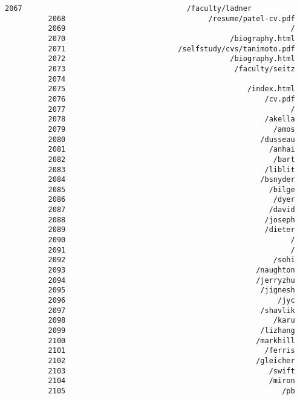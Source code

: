 \documentclass[11pt]{article}
\begin{document}
\begin{Verbatim}[commandchars=\\\{\}]
          2067                                      /faculty/ladner
          2068                                 /resume/patel-cv.pdf
          2069                                                    /
          2070                                      /biography.html
          2071                          /selfstudy/cvs/tanimoto.pdf
          2072                                      /biography.html
          2073                                       /faculty/seitz
          2074                                                     
          2075                                          /index.html
          2076                                              /cv.pdf
          2077                                                    /
          2078                                              /akella
          2079                                                /amos
          2080                                             /dusseau
          2081                                               /anhai
          2082                                                /bart
          2083                                              /liblit
          2084                                             /bsnyder
          2085                                               /bilge
          2086                                                /dyer
          2087                                               /david
          2088                                              /joseph
          2089                                              /dieter
          2090                                                    /
          2091                                                    /
          2092                                                /sohi
          2093                                            /naughton
          2094                                            /jerryzhu
          2095                                             /jignesh
          2096                                                 /jyc
          2097                                             /shavlik
          2098                                                /karu
          2099                                             /lizhang
          2100                                            /markhill
          2101                                              /ferris
          2102                                            /gleicher
          2103                                               /swift
          2104                                               /miron
          2105                                                  /pb

\end{Verbatim}
\end{document}
